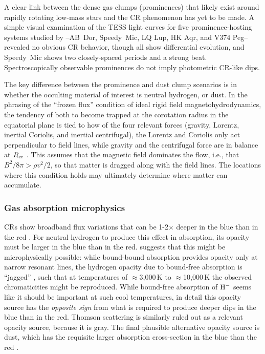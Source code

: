 \documentclass[11pt,twocolumn,tighten]{aastex63}
\begin{document}
A clear link between the dense gas clumps (prominences) that likely
exist around rapidly rotating low-mass stars and the CR phenomenon
has yet to be made.  A simple visual examination of the TESS light
curves for five prominence-hosting systems studied by
\citet{2019MNRAS.482.2853J}--AB~Dor, Speedy~Mic, LQ Lup, HK Aqr, and
V374 Peg--revealed no obvious CR behavior, though all show
differential evolution, and Speedy~Mic shows two closely-spaced
periods and a strong beat.  Spectroscopically observable prominences
do not imply photometric CR-like dips.

The key difference between the prominence and dust clump scenarios is
in whether the occulting material of interest is neutral hydrogen, or
dust.  In the phrasing of the ``frozen flux'' condition of ideal rigid
field magnetohydrodynamics, the tendency of both to become trapped at
the corotation radius in the equatorial plane is tied to how of the
four relevant forces (gravity, Lorentz, inertial Coriolis, and
inertial centrifugal), the Lorentz and Coriolis only act perpendicular
to field lines, while gravity and the centrifugal force are in balance
at $R_{\rm cr}$ \citep[see][Sec.~2]{2005MNRAS.357..251T}.  
This assumes that the magnetic field dominates the flow, i.e., that
$B^2/8\pi > \rho v^2 /2$, so that matter is dragged along with the
field lines.
The locations where this condition holds may ultimately determine where
matter can accumulate.



\subsubsection{Gas absorption microphysics}

CRs show broadband flux variations that can be 1-2$\times$ deeper in
the blue than in the red
\citep{2017PASJ...69L...2O,2020AJ....160...86B,2022AJ....163..144G,2023MNRAS.518.2921K}.
For neutral hydrogen to produce this effect in absorption, its opacity
must be larger in the blue than in the red.
\citet{1992oasp.book.....G} suggests that this might be
microphysically possible: while bound-bound absorption provides
opacity only at narrow resonant lines, the hydrogen opacity due to
bound-free absorption is ``jagged'' \citep[see][Figure 8.5 and
Eq.~8.8]{1992oasp.book.....G}, such that at temperatures of
$\approx$3{,}000\,K to $\approx$10{,}000\,K the observed
chromaticities might be reproduced.  While bound-free absorption of
${\rm H}^{-}$ seems like it should be important at such cool
temperatures, in detail this opacity source has the {\it opposite
sign} from what is required to produce deeper dips in the blue than in
the red.  Thomson scattering is similarly ruled out as a relevant
opacity source, because it is gray.  The final plausible alternative
opacity source is dust, which has the requisite larger absorption
cross-section in the blue than the red \citep{1989ApJ...345..245C}.
\end{document}
